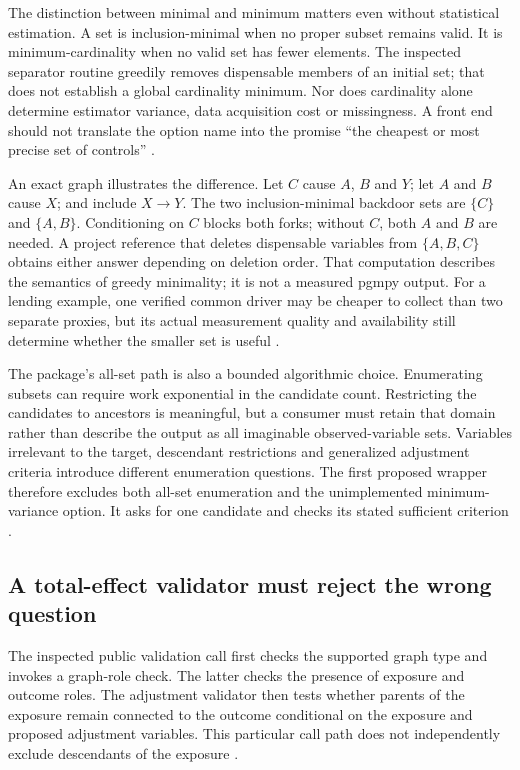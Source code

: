 The distinction between minimal and minimum matters even without statistical
estimation. A set is inclusion-minimal when no proper subset remains valid.
It is minimum-cardinality when no valid set has fewer elements. The inspected
separator routine greedily removes dispensable members of an initial set;
that does not establish a global cardinality minimum. Nor does cardinality
alone determine estimator variance, data acquisition cost or missingness.
A front end should not translate the option name into the promise
``the cheapest or most precise set of controls''
\cite{exec13_pgmpy_reuse_primary}.

An exact graph illustrates the difference. Let $C$ cause $A$, $B$ and $Y$;
let $A$ and $B$ cause $X$; and include $X\to Y$. The two inclusion-minimal
backdoor sets are $\{C\}$ and $\{A,B\}$. Conditioning on $C$ blocks both
forks; without $C$, both $A$ and $B$ are needed. A project reference that
deletes dispensable variables from $\{A,B,C\}$ obtains either answer
depending on deletion order. That computation describes the semantics of
greedy minimality; it is not a measured pgmpy output. For a lending example,
one verified common driver may be cheaper to collect than two separate
proxies, but its actual measurement quality and availability still determine
whether the smaller set is useful \cite{exec13_pgmpy_reuse_oracle}.

The package's all-set path is also a bounded algorithmic choice. Enumerating
subsets can require work exponential in the candidate count. Restricting
the candidates to ancestors is meaningful, but a consumer must retain that
domain rather than describe the output as all imaginable observed-variable
sets. Variables irrelevant to the target, descendant restrictions and
generalized adjustment criteria introduce different enumeration questions.
The first proposed wrapper therefore excludes both all-set enumeration and
the unimplemented minimum-variance option. It asks for one candidate and
checks its stated sufficient criterion
\cite{exec13_pgmpy_reuse_primary}.

\subsection{A total-effect validator must reject the wrong question}

The inspected public validation call first checks the supported graph type
and invokes a graph-role check. The latter checks the presence of exposure
and outcome roles. The adjustment validator then tests whether parents of
the exposure remain connected to the outcome conditional on the exposure
and proposed adjustment variables. This particular call path does not
independently exclude descendants of the exposure
\cite{exec13_pgmpy_reuse_primary}.

